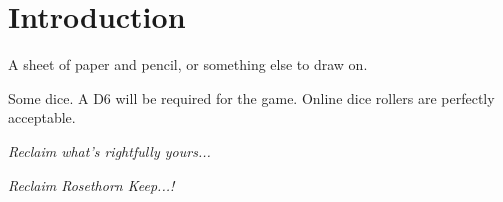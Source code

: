 \documentclass[english, 10pt,openany,letterpaper]{book}
\begin{document}




\newpage

\toc[2]

\chapter{Introduction}


\tld  A sheet of paper and pencil, or something else to draw on.

\tld  Some dice. A D6 will be required for the game. Online dice rollers are perfectly acceptable.

\skipline
\begin{adjustbox}{left}
\em Reclaim what’s rightfully yours...\em
\end{adjustbox}
\begin{adjustbox}{right}
	\em Reclaim Rosethorn Keep...! \em
\end{adjustbox}









\pagebreak






\end{document}
